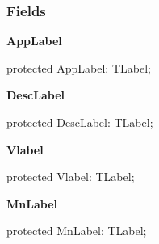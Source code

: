 \documentclass{report}
\newif\ifpdf
\begin{document}
\subsubsection*{\large{\textbf{Fields}}\normalsize\hspace{1ex}\hfill}
\begin{list}{}{
\setlength{\itemindent}{0cm}
\setlength{\listparindent}{0cm}
\setlength{\leftmargin}{\evensidemargin}
\addtolength{\leftmargin}{\tmplength}
\settowidth{\labelsep}{X}
\addtolength{\leftmargin}{\labelsep}
\setlength{\labelwidth}{\tmplength}
}
\label{common.TListEntry-AppLabel}
\item[\textbf{AppLabel}\hfill]
\ifpdf
\begin{flushleft}
\fi
\begin{ttfamily}
protected AppLabel: TLabel;\end{ttfamily}

\ifpdf
\end{flushleft}
\fi


\par  \label{common.TListEntry-DescLabel}
\item[\textbf{DescLabel}\hfill]
\ifpdf
\begin{flushleft}
\fi
\begin{ttfamily}
protected DescLabel: TLabel;\end{ttfamily}

\ifpdf
\end{flushleft}
\fi


\par  \label{common.TListEntry-Vlabel}
\item[\textbf{Vlabel}\hfill]
\ifpdf
\begin{flushleft}
\fi
\begin{ttfamily}
protected Vlabel: TLabel;\end{ttfamily}

\ifpdf
\end{flushleft}
\fi


\par  \label{common.TListEntry-MnLabel}
\item[\textbf{MnLabel}\hfill]
\ifpdf
\begin{flushleft}
\fi
\begin{ttfamily}
protected MnLabel: TLabel;\end{ttfamily}

\ifpdf
\end{flushleft}
\fi



\end{list}
\end{document}
